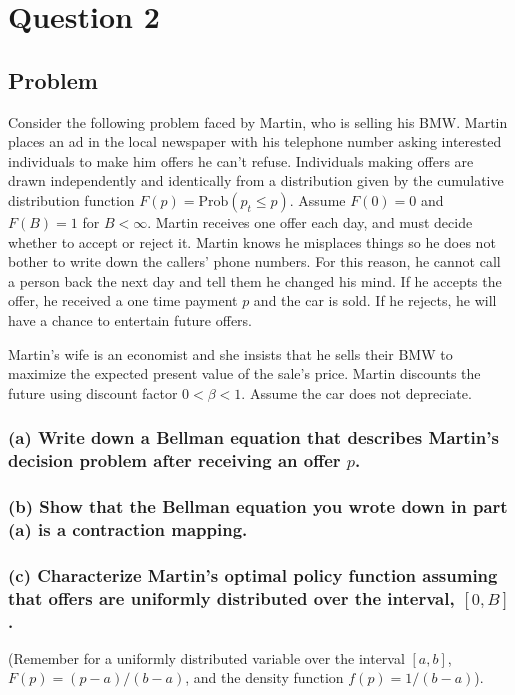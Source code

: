 \documentclass[10pt, a4paper]{article}
\begin{document}
\section*{Question 2}
  \subsection*{Problem}
    Consider the following problem faced by Martin, who is selling his BMW. Martin places an ad in the local newspaper with his telephone number asking interested individuals to make him offers he can't refuse. Individuals making offers are drawn independently and identically from a distribution given by the cumulative distribution function $F(p) = \text{Prob}(p_t \leq p)$. Assume $F(0) = 0$ and $F(B) = 1$ for $B < \infty$. Martin receives one offer each day, and must decide whether to accept or reject it. Martin knows he misplaces things so he does not bother to write down the callers' phone numbers. For this reason, he cannot call a person back the next day and tell them he changed his mind. If he accepts the offer, he received a one time payment $p$ and the car is sold. If he rejects, he will have a chance to entertain future offers.

    Martin's wife is an economist and she insists that he sells their BMW to maximize the expected present value of the sale's price. Martin discounts the future using discount factor $0 < \beta < 1$. Assume the car does not depreciate.

    \subsubsection*{(a) Write down a Bellman equation that describes Martin's decision problem after receiving an offer $p$.}

    \subsubsection*{(b) Show that the Bellman equation you wrote down in part (a) is a contraction mapping.}

    \subsubsection*{(c) Characterize Martin's optimal policy function assuming that offers are uniformly distributed over the interval, $[0, B]$.}
    (Remember for a uniformly distributed variable over the interval $[a, b]$, $F(p) = (p-a)/(b-a)$, and the density function $f(p) = 1/(b-a)$).
\end{document}

